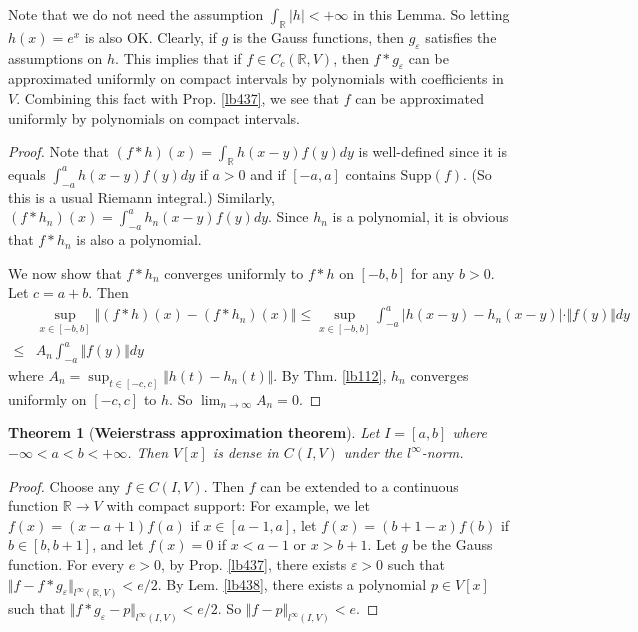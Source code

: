 \documentclass[12pt,b5paper,notitlepage]{article}
\theoremstyle{definition}
\theoremstyle{plain}
\newtheorem{thm}[df]{Theorem}
\newcommand{\Rbb}{\mathbb R}
\newcommand{\Supp}{\mathrm{Supp}}
\newcommand{\eps}{\varepsilon}
\numberwithin{equation}{section}
\begin{document}
Note that we do not need the assumption $\int_\Rbb |h|<+\infty$ in this Lemma. So letting $h(x)=e^x$ is also OK. Clearly, if $g$ is the Gauss functions, then $g_\eps$ satisfies the assumptions on $h$. This implies that if $f\in C_c(\Rbb,V)$, then $f*g_\eps$ can be approximated uniformly on compact intervals by  polynomials with coefficients in $V$. Combining this fact with Prop. \ref{lb437}, we see that $f$ can be approximated uniformly by polynomials on compact intervals.

\begin{proof}
Note that $(f*h)(x)=\int_\Rbb h(x-y)f(y)dy$ is well-defined since it is equals $\int_{-a}^a h(x-y)f(y)dy$ if $a>0$ and if $[-a,a]$ contains $\Supp(f)$. (So this is a usual Riemann integral.) Similarly, $(f*h_n)(x)=\int_{-a}^a h_n(x-y)f(y)dy$. Since $h_n$ is a polynomial, it is obvious that $f*h_n$ is also a polynomial.

We now show that $f*h_n$ converges uniformly to $f*h$ on $[-b,b]$ for any $b>0$. Let $c=a+b$. Then 
\begin{align*}
&\sup_{x\in[-b,b]}\Vert (f*h)(x)-(f*h_n)(x)\Vert\leq\sup_{x\in[-b,b]}\int_{-a}^a |h(x-y)-h_n(x-y)|\cdot\Vert f(y)\Vert dy\\
\leq&A_n\int_{-a}^a\Vert f(y)\Vert dy
\end{align*}
where $A_n=\sup_{t\in[-c,c]}\Vert h(t)-h_n(t)\Vert$. By Thm. \ref{lb112}, $h_n$ converges uniformly on $[-c,c]$ to $h$. So $\lim_{n\rightarrow\infty}A_n=0$.
\end{proof}


\begin{thm}[\textbf{Weierstrass approximation theorem}]  \label{lb441}
Let $I=[a,b]$ where $-\infty<a<b<+\infty$. Then $V[x]$ is dense in $C(I,V)$ under the $l^\infty$-norm.
\end{thm}

\begin{proof}
Choose any $f\in C(I,V)$. Then $f$ can be extended to a continuous function $\Rbb\rightarrow V$ with compact support: For example, we let $f(x)=(x-a+1)f(a)$ if $x\in[a-1,a]$, let $f(x)=(b+1-x)f(b)$ if $b\in[b,b+1]$, and let $f(x)=0$ if $x<a-1$ or $x>b+1$. Let $g$ be the Gauss function. For every $e>0$, by Prop. \ref{lb437}, there exists $\eps>0$ such that $\Vert f-f*g_\eps\Vert_{l^\infty(\Rbb,V)}<e/2$. By Lem. \ref{lb438}, there exists a polynomial $p\in V[x]$ such that $\Vert f*g_\eps-p\Vert_{l^\infty(I,V)}<e/2$. So $\Vert f-p\Vert_{l^\infty(I,V)}<e$.
\end{proof}
\end{document}
